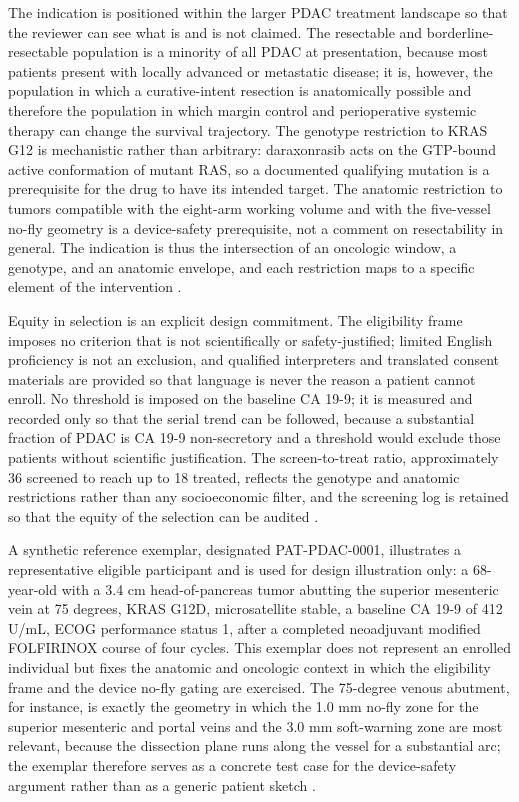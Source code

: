 The indication is positioned within the larger PDAC treatment landscape so that the
reviewer can see what is and is not claimed. The resectable and borderline-resectable
population is a minority of all PDAC at presentation, because most patients present
with locally advanced or metastatic disease; it is, however, the population in which
a curative-intent resection is anatomically possible and therefore the population in
which margin control and perioperative systemic therapy can change the survival
trajectory. The genotype restriction to KRAS G12 is mechanistic rather than
arbitrary: daraxonrasib acts on the GTP-bound active conformation of mutant RAS, so
a documented qualifying mutation is a prerequisite for the drug to have its intended
target. The anatomic restriction to tumors compatible with the eight-arm working
volume and with the five-vessel no-fly geometry is a device-safety prerequisite, not
a comment on resectability in general. The indication is thus the intersection of an
oncologic window, a genotype, and an anatomic envelope, and each restriction maps to
a specific element of the intervention \cite{daraxwhipple,onpremwhippl}.

Equity in selection is an explicit design commitment. The eligibility frame imposes
no criterion that is not scientifically or safety-justified; limited English
proficiency is not an exclusion, and qualified interpreters and translated consent
materials are provided so that language is never the reason a patient cannot enroll.
No threshold is imposed on the baseline CA 19-9; it is measured and recorded only so
that the serial trend can be followed, because a substantial fraction of PDAC is CA
19-9 non-secretory and a threshold would exclude those patients without scientific
justification. The screen-to-treat ratio, approximately 36 screened to reach up to
18 treated, reflects the genotype and anatomic restrictions rather than any
socioeconomic filter, and the screening log is retained so that the equity of the
selection can be audited \cite{daraxwhipple,clintrustpai}.

A synthetic reference exemplar, designated PAT-PDAC-0001, illustrates a
representative eligible participant and is used for design illustration only: a
68-year-old with a 3.4 cm head-of-pancreas tumor abutting the superior mesenteric
vein at 75 degrees, KRAS G12D, microsatellite stable, a baseline CA 19-9 of 412
U/mL, ECOG performance status 1, after a completed neoadjuvant modified FOLFIRINOX
course of four cycles. This exemplar does not represent an enrolled individual but
fixes the anatomic and oncologic context in which the eligibility frame and the
device no-fly gating are exercised. The 75-degree venous abutment, for instance, is
exactly the geometry in which the 1.0 mm no-fly zone for the superior mesenteric and
portal veins and the 3.0 mm soft-warning zone are most relevant, because the
dissection plane runs along the vessel for a substantial arc; the exemplar therefore
serves as a concrete test case for the device-safety argument rather than as a
generic patient sketch \cite{daraxwhipple,onpremwhippl}.

